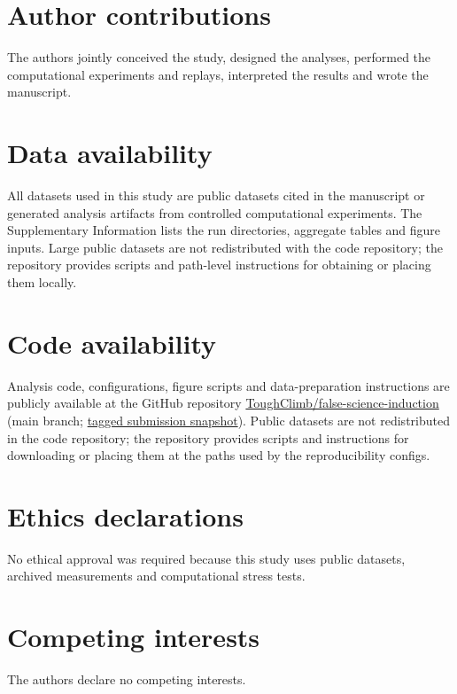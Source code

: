 \section*{Author contributions}

The authors jointly conceived the study, designed the analyses, performed the
computational experiments and replays, interpreted the results and wrote the
manuscript.

\section*{Data availability}

All datasets used in this study are public datasets cited in the manuscript or generated analysis artifacts from controlled computational experiments. The Supplementary Information lists the run directories, aggregate tables and figure inputs. Large public datasets are not redistributed with the code repository; the repository provides scripts and path-level instructions for obtaining or placing them locally.

\section*{Code availability}

Analysis code, configurations, figure scripts and data-preparation instructions are publicly available at the GitHub repository
\href{https://github.com/ToughClimb/false-science-induction}{ToughClimb/false-science-induction}
(main branch; \href{https://github.com/ToughClimb/false-science-induction/tree/natcomm-submission-20260616}{tagged submission snapshot}). Public datasets are not redistributed in the code repository; the repository provides scripts and instructions for downloading or placing them at the paths used by the reproducibility configs.

\section*{Ethics declarations}

No ethical approval was required because this study uses public datasets, archived measurements and computational stress tests.

\section*{Competing interests}

The authors declare no competing interests.
